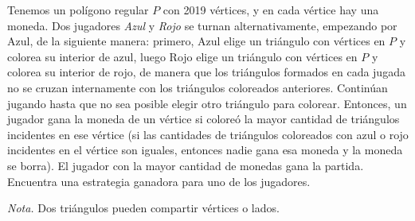 Tenemos un polígono regular $P$ con 2019 vértices, y en cada vértice hay una moneda. Dos jugadores \textit{Azul} y \textit{Rojo} se turnan alternativamente, empezando por Azul, de la siguiente manera: primero, Azul elige un triángulo con vértices en $P$ y colorea su interior de azul, luego Rojo elige un triángulo con vértices en $P$ y colorea su interior de rojo, de manera que los triángulos formados en cada jugada no se cruzan internamente con los triángulos coloreados anteriores. Continúan jugando hasta que no sea posible elegir otro triángulo para colorear. Entonces, un jugador gana la moneda de un vértice si coloreó la mayor cantidad de triángulos incidentes en ese vértice (si las cantidades de triángulos coloreados con azul o rojo incidentes en el vértice son iguales, entonces nadie gana esa moneda y la moneda se borra). El jugador con la mayor cantidad de monedas gana la partida.  Encuentra una estrategia ganadora para uno de los jugadores. 


\textit{Nota.} Dos triángulos pueden compartir vértices o lados.
